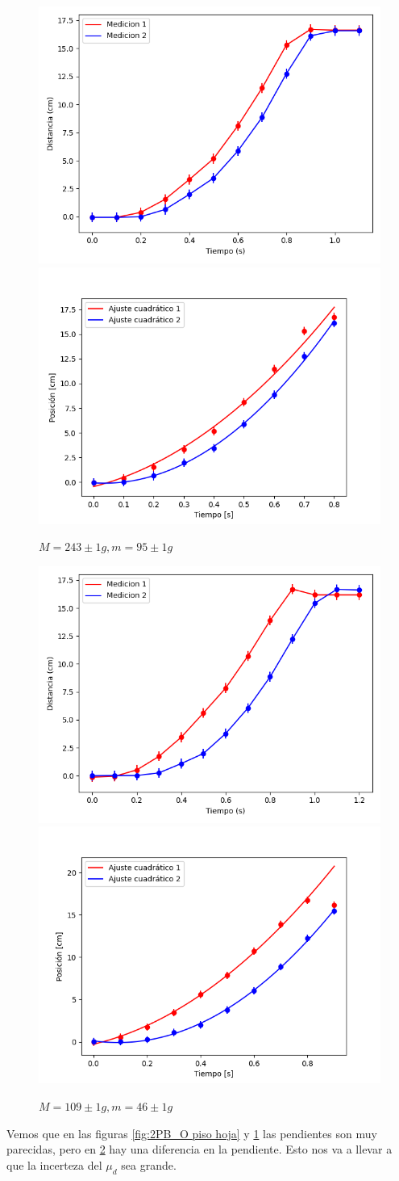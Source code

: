 \documentclass[12pt,a4]{article}
\begin{document}
\begin{figure}[H]
    \centering
    \includegraphics[width=0.4\linewidth]{TiempoVsDistanciaPisoHojaM_OP.png}
    \includegraphics[width=0.44\linewidth]{ajuste2_PisoHojaM_OP.png}
    \caption{$M = 243 \pm 1 g, m = 95 \pm 1 g$}
    \label{fig:M_OP piso hoja}
\end{figure}

\begin{figure}[H]
    \centering
    \includegraphics[width=0.4\linewidth]{TiempoVsDistanciaPisoHojaV_2P.png}
    \includegraphics[width=0.44\linewidth]{ajuste2_PisoHojaV_2P.png}
    \caption{$M = 109 \pm 1 g, m = 46 \pm 1 g$}
    \label{fig:V_2P piso hoja}
\end{figure}

Vemos que en las figuras \ref{fig:2PB_O piso hoja} y \ref{fig:M_OP piso hoja} las pendientes son muy parecidas, pero en \ref{fig:V_2P piso hoja} hay una diferencia en la pendiente. Esto nos va a llevar a que la incerteza del $\mu_d$ sea grande.
\end{document}
